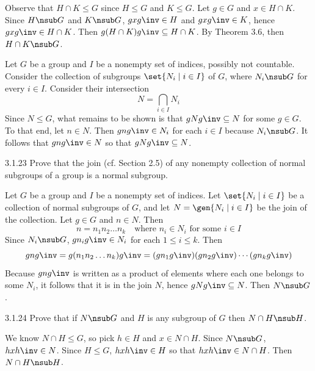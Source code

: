 \begin{solenum}
    \item Observe that $H \cap K \leq G$ since $H \leq G$ and $K \leq G$.
	Let $g \in G$ and $x \in H \cap K$.
	Since $H \nsub G$ and $K \nsub G$, $gxg\inv \in H$ and $gxg\inv \in K$, hence $gxg\inv \in H \cap K$.
	Then $g(H \cap K)g\inv \subseteq H \cap K$.
	By Theorem 3.6, then $H \cap K \nsub G$.
    \item Let $G$ be a group and $I$ be a nonempty set of indices, possibly not countable.
	Consider the collection of subgroups $\set{N_i \mid i \in I}$ of $G$, where $N_i \nsub G$ for every $i \in I$.
	Consider their intersection
    \[
    	N = \bigcap_{i \in I} N_i
    \]
    Since $N \leq G$, what remains to be shown is that $gNg\inv \subseteq N$ for some $g \in G$.
	To that end, let $n \in N$.
	Then $gng\inv \in N_i$ for each $i \in I$ because $N_i \nsub G$.
	It follows that $gng\inv \in N$ so that $gNg\inv \subseteq N$.
\end{solenum}

\begin{exercise}{3.1.23}
    Prove that the join (cf.
	Section 2.5) of any nonempty collection of normal subgroups of a group is a normal subgroup.
\end{exercise}

\begin{sol}
    Let $G$ be a group and $I$ be a nonempty set of indices.
	Let $\set{N_i \mid i \in I}$ be a collection of normal subgroups of $G$, and let $N = \gen{N_i \mid i \in I}$ be the join of the collection.
	Let $g \in G$ and $n \in N$.
	Then
    \[
    	n = n_1n_2 \dots n_k \quad \text{where $n_i \in N_i$ for some $i \in I$}
    \]
    Since $N_i \nsub G$, $gn_ig\inv \in N_i$ for each $1 \leq i \leq k$.
	Then
    \[
    	gng\inv = g(n_1n_2 \ldots n_k)g\inv = (gn_1g\inv)(gn_2g\inv) \cdots (gn_kg\inv)
    \]
    Because $gng\inv$ is written as a product of elements where each one belongs to some $N_i$, it follows that it is in the join $N$, hence $gNg\inv \subseteq N$.
	Then $N \nsub G$.
\end{sol}

\begin{exercise}{3.1.24}
    Prove that if $N \nsub G$ and $H$ is any subgroup of $G$ then $N \cap H \nsub H$.
\end{exercise}

\begin{sol}
    We know $N \cap H \leq G$, so pick $h \in H$ and $x \in N \cap H$.
	Since $N \nsub G$, $hxh\inv \in N$.
	Since $H \leq G$, $hxh\inv \in H$ so that $hxh\inv \in N \cap H$.
	Then $N \cap H \nsub H$.
\end{sol}

